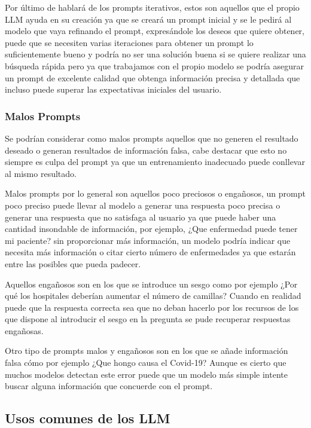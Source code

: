 Por último de hablará de los prompts iterativos, estos son aquellos que el propio LLM ayuda en su creación ya que se creará un prompt inicial y se le pedirá al modelo que vaya refinando el prompt, expresándole los deseos que quiere obtener, puede que se necesiten varias iteraciones para obtener un prompt lo suficientemente bueno y podría no ser una solución buena si se quiere realizar una búsqueda rápida pero ya que trabajamos con el propio modelo se podría asegurar un prompt de excelente calidad que obtenga información precisa y detallada que incluso puede superar las expectativas iniciales del usuario.

\subsubsection{Malos Prompts}

Se podrían considerar como malos prompts aquellos que no generen el resultado deseado o generan resultados de información falsa, cabe destacar que esto no siempre es culpa del prompt ya que un entrenamiento inadecuado puede conllevar al mismo resultado.

Malos prompts por lo general son aquellos poco preciosos o engañosos, un prompt poco preciso puede llevar al modelo a generar una respuesta poco precisa o generar una respuesta que no satisfaga al usuario ya que puede haber una cantidad insondable de información, por ejemplo, ¿Que enfermedad puede tener mi paciente? sin proporcionar más información, un modelo podría indicar que necesita más información o citar cierto número de enfermedades ya que estarán entre las posibles que pueda padecer.

Aquellos engañosos son en los que se introduce un sesgo como por ejemplo ¿Por qué los hospitales deberían aumentar el número de camillas? Cuando en realidad puede que la respuesta correcta sea que no deban hacerlo por los recursos de los que dispone al introducir el sesgo en la pregunta se pude recuperar respuestas engañosas. 

Otro tipo de prompts malos y engañosos son en los que se añade información falsa cómo por ejemplo ¿Que hongo causa el Covid-19? Aunque es cierto que muchos modelos detectan este error puede que un modelo más simple intente buscar alguna información que concuerde con el prompt.

\subsection{Usos comunes de los LLM}

